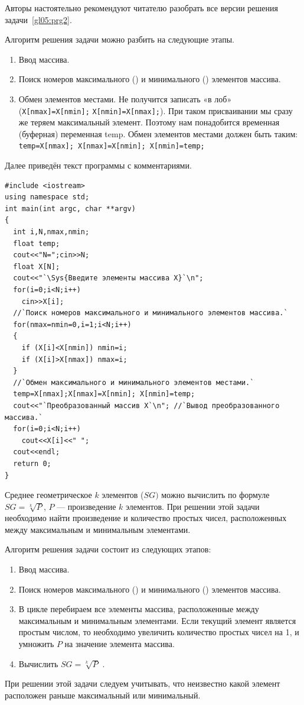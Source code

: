Авторы настоятельно рекомендуют читателю разобрать все версии решения задачи~\ref{gl05:prg2}.


Алгоритм решения задачи можно разбить на следующие этапы.

\begin{enumerate}
\item Ввод массива.
\item Поиск номеров максимального () и минимального () элементов массива.
\item Обмен элементов местами. Не получится записать «в лоб» (\lstinline!X[nmax]=X[nmin];!
\mbox{\lstinline!X[nmin]=X[nmax];!)}. 
При таком присваивании мы сразу же теряем максимальный элемент. 
Поэтому нам понадобится временная (буферная) переменная temp. Обмен элементов
местами должен быть таким:
\mbox{\lstinline!temp=X[nmax]; X[nmax]=X[nmin]; X[nmin]=temp;!}
\end{enumerate}

Далее приведён текст программы с комментариями.
\begin{lstlisting}
#include <iostream>
using namespace std;
int main(int argc, char **argv)
{
  int i,N,nmax,nmin;
  float temp;
  cout<<"N=";cin>>N;
  float X[N];
  cout<<"`\Sys{Введите элементы массива Х}`\n";
  for(i=0;i<N;i++)
    cin>>X[i];
  //`Поиск номеров максимального и минимального элементов массива.`
  for(nmax=nmin=0,i=1;i<N;i++)
  {
    if (X[i]<X[nmin]) nmin=i;
    if (X[i]>X[nmax]) nmax=i;
  }
  //`Обмен максимального и минимального элементов местами.`
  temp=X[nmax];X[nmax]=X[nmin]; X[nmin]=temp;
  cout<<"`Преобразованный массив Х`\n"; //`Вывод преобразованного массива.`
  for(i=0;i<N;i++)
    cout<<X[i]<<" ";
  cout<<endl;
  return 0;
}
\end{lstlisting}


Среднее геометрическое $k$ элементов ($SG)$ можно вычислить по формуле 
$SG=\sqrt[{k}]{P}$, $P$ --- произведение $k$ элементов. При решении этой задачи
необходимо найти  произведение и количество простых чисел, расположенных между максимальным и минимальным элементами.

Алгоритм решения задачи состоит из следующих этапов:

\begin{enumerate}
\item Ввод массива.
\item Поиск номеров максимального () и минимального () элементов массива.
\item В цикле перебираем все элементы массива, расположенные между максимальным и минимальным элементами. Если текущий
элемент является простым числом, то необходимо увеличить количество простых чисел на 1, и умножить $P$ на значение
элемента массива.
\item Вычислить  $SG=\sqrt[{k}]{P}$ .
\end{enumerate}
При решении этой задачи следуем учитывать, что неизвестно какой элемент расположен раньше максимальный или минимальный.

